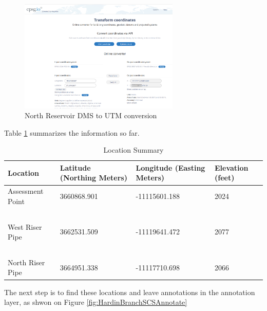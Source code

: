 \documentclass[12pt]{article}
\begin{document}
\begin{enumerate}
\begin{figure}[h!] %
   \centering
   \includegraphics[width=3in]{NorthCoordinates.png} 
   \caption{North Reservoir DMS to UTM conversion}
   \label{fig:NorthCoordinates}
\end{figure}

\clearpage

Table \ref{tab:SummaryLocations} summarizes the information so far.

\begin{table}[htbp]
   \centering
   \caption{Location Summary}
   \begin{tabular}{p{1.5in}p{1.5in}p{1.5in}p{1in}} %
Location & Latitude (Northing Meters) & Longitude (Easting Meters) & Elevation (feet) \\
\hline
\hline
Assessment Point& 3660868.901 & -11115601.188 & 2024 \\
~ & ~ & ~ & ~ \\
West Riser Pipe & 3662531.509 & -11119641.472 & 2077 \\
~ & ~ & ~ & ~ \\
North Riser Pipe & 3664951.338 & -11117710.698 & 2066  \\
\hline
\end{tabular}
\label{tab:SummaryLocations}
\end{table}

The next step is to find these locations and leave annotations in the annotation layer, as shwon on Figure \ref{fig:HardinBranchSCSAnnotate}


\end{enumerate}
\end{document}
